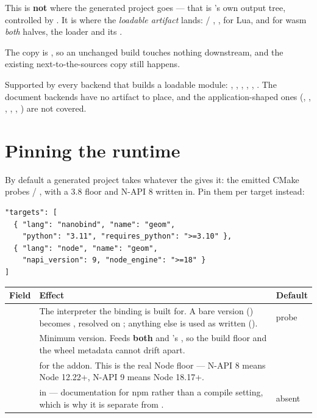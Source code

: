 \begin{warn}
This is \textbf{not} where the generated project goes --- that is
's own output tree, controlled by . It
is where the \emph{loadable artifact} lands:  / ,
,  for Lua, and for wasm \emph{both} halves, the
 loader and its .
\end{warn}

The copy is , so an unchanged build touches nothing
downstream, and the existing next-to-the-sources copy still happens.

Supported by every backend that builds a loadable module: ,
, , , , . The
document backends have no artifact to place, and the application-shaped ones
(, , , , , )
are not covered.

\section{Pinning the runtime}
\label{sec:runtimepins}

By default a generated project takes whatever the  gives it: the
emitted CMake probes  / , with a 3.8 floor and N-API 8
written in. Pin them per target instead:

\begin{lstlisting}[style=json]
"targets": [
  { "lang": "nanobind", "name": "geom",
    "python": "3.11", "requires_python": ">=3.10" },
  { "lang": "node", "name": "geom",
    "napi_version": 9, "node_engine": ">=18" }
]
\end{lstlisting}

\begin{center}
\small
\begin{tabular}{@{}lL{7.6cm}l@{}}
\toprule
\textbf{Field} & \textbf{Effect} & \textbf{Default} \\
\midrule
{} &
  The interpreter the binding is built for. A bare version ()
  becomes , resolved on ; anything else is used as
  written (). & probe  \\
\addlinespace
{} &
  Minimum version. Feeds \textbf{both}  and
  's , so the build floor and the
  wheel metadata cannot drift apart. &  \\
\addlinespace
{} &
   for the addon. This is the real Node floor --- N-API 8
  means Node 12.22+, N-API 9 means Node 18.17+. &  \\
\addlinespace
{} &
   in  --- documentation for npm rather
  than a compile setting, which is why it is separate from
  . & absent \\
\bottomrule
\end{tabular}
\end{center}

